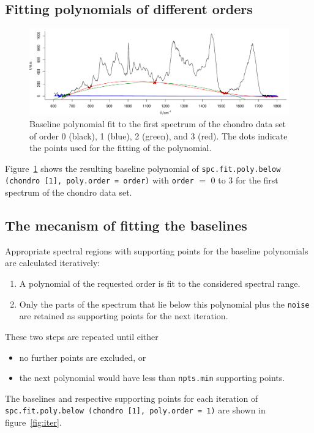 \documentclass[a4paper, 10pt, smallheadings, DIV15]{scrartcl}
\newcommand{\code}[1]{\nohyphens{\texttt{#1}}\xspace}
\begin{document}
\subsection*{Fitting  polynomials of different orders}
\begin{figure}[t]
\begin{center}
\includegraphics[width = .75\textwidth]{baselinebelow-figorder}
\caption{Baseline polynomial fit to the first spectrum of the chondro data set of order 
0 (black), 1 (blue), 2 (green), and 3 (red). The dots indicate the points used for the fitting of the polynomial.}
\label{fig:order}
\end{center}
\end{figure}
Figure~\ref{fig:order} shows the resulting baseline polynomial of 
\code{spc.fit.poly.below (chondro [1], poly.order = order)} 
with \code{order} $=$ 0 to 3 for the first spectrum of the chondro data set. 

\subsection*{The mecanism of fitting the baselines}
Appropriate spectral regions with supporting points for the baseline polynomials are calculated iteratively:
\begin{enumerate}
\item A polynomial of the requested order is fit to the considered spectral range.
\item Only the parts of the spectrum that lie below this polynomial plus the \code{noise} are retained as supporting points for 
the next iteration. 
\end{enumerate}
These two steps are repeated until either
\begin{itemize}
\item no further points are excluded, or
\item the next polynomial would have less than \code{npts.min} supporting points.
\end{itemize}
The baselines and respective supporting points for each iteration of
\code{spc.fit.poly.below (chondro [1], poly.order = 1)}
are shown in figure~\ref{fig:iter}.
\end{document}
